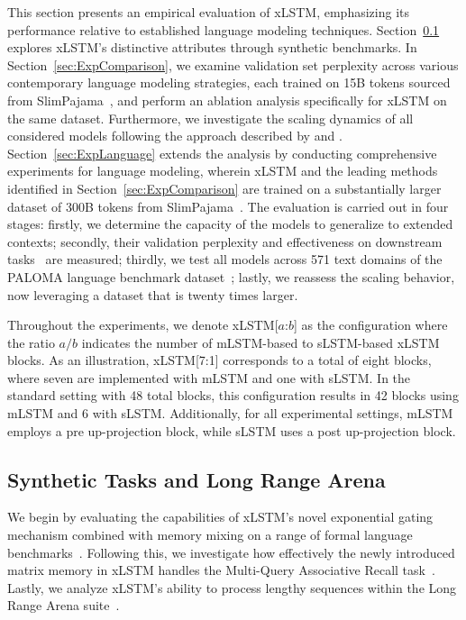 This section presents an empirical evaluation of xLSTM, emphasizing its performance relative to established language modeling techniques. Section~\ref{sec:ExpSyntethic} explores xLSTM's distinctive attributes through synthetic benchmarks. 
In Section~\ref{sec:ExpComparison}, we examine validation set perplexity across various contemporary language modeling strategies, each trained on 15B tokens sourced from SlimPajama~\citep{Soboleva:23}, and perform an ablation analysis specifically for xLSTM on the same dataset. Furthermore, we investigate the scaling dynamics of all considered models following the approach described by \citet{Kaplan:20} and \citet{Brown:20short}.
Section~\ref{sec:ExpLanguage} extends the analysis by conducting comprehensive experiments for language modeling, wherein xLSTM and the leading methods identified in Section~\ref{sec:ExpComparison} are trained on a substantially larger dataset of 300B tokens from SlimPajama~\citep{Soboleva:23}. The evaluation is carried out in four stages: firstly, we determine the capacity of the models to generalize to extended contexts; secondly, their validation perplexity and effectiveness on downstream tasks~\citep{Sutawika:24} are measured; thirdly, we test all models across 571 text domains of the PALOMA language benchmark dataset~\citep{Magnusson:23arxivshort}; lastly, we reassess the scaling behavior, now leveraging a dataset that is twenty times larger.

\label{sec:xlstm_blocks_notation}
Throughout the experiments, we denote xLSTM[$a$:$b$] as the configuration where the ratio $a/b$ indicates the number of mLSTM-based to sLSTM-based xLSTM blocks. As an illustration, xLSTM[7:1] corresponds to a total of eight blocks, where seven are implemented with mLSTM and one with sLSTM. In the standard setting with 48 total blocks, this configuration results in 42 blocks using mLSTM and 6 with sLSTM. Additionally, for all experimental settings, mLSTM employs a pre up-projection block, while sLSTM uses a post up-projection block.

\subsection{Synthetic Tasks and Long Range Arena}
\label{sec:ExpSyntethic}
We begin by evaluating the capabilities of xLSTM's novel exponential gating mechanism combined with memory mixing on a range of formal language benchmarks~\citep{Deletang:23}. Following this, we investigate how effectively the newly introduced matrix memory in xLSTM handles the Multi-Query Associative Recall task~\citep{Arora:23arxiv}. Lastly, we analyze xLSTM's ability to process lengthy sequences within the Long Range Arena suite~\citep{Tay:21}.

